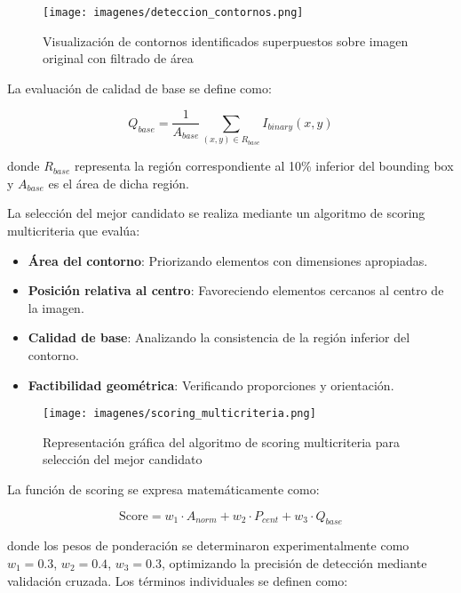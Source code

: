 \begin{figure}[h]
\centering
\texttt{[image: imagenes/deteccion\_contornos.png]}
\caption{Visualización de contornos identificados superpuestos sobre imagen original con filtrado de área}
\label{fig:deteccion_contornos}
\end{figure}

La evaluación de calidad de base se define como:

\begin{equation}
Q_{base} = \frac{1}{A_{base}} \sum_{(x,y) \in R_{base}} I_{binary}(x,y)
\end{equation}

donde $R_{base}$ representa la región correspondiente al 10\% inferior del bounding box y $A_{base}$ es el área de dicha región.

La selección del mejor candidato se realiza mediante un algoritmo de scoring multicriteria que evalúa:

\begin{itemize}
    \item \textbf{Área del contorno}: Priorizando elementos con dimensiones apropiadas.
    \item \textbf{Posición relativa al centro}: Favoreciendo elementos cercanos al centro de la imagen.
    \item \textbf{Calidad de base}: Analizando la consistencia de la región inferior del contorno.
    \item \textbf{Factibilidad geométrica}: Verificando proporciones y orientación.
\end{itemize}

\begin{figure}[h]
\centering
\texttt{[image: imagenes/scoring\_multicriteria.png]}
\caption{Representación gráfica del algoritmo de scoring multicriteria para selección del mejor candidato}
\label{fig:scoring_multicriteria}
\end{figure}

La función de scoring se expresa matemáticamente como:

\begin{equation}
\text{Score} = w_1 \cdot A_{norm} + w_2 \cdot P_{cent} + w_3 \cdot Q_{base}
\end{equation}

donde los pesos de ponderación se determinaron experimentalmente como $w_1 = 0.3$, $w_2 = 0.4$, $w_3 = 0.3$, optimizando la precisión de detección mediante validación cruzada. Los términos individuales se definen como:


